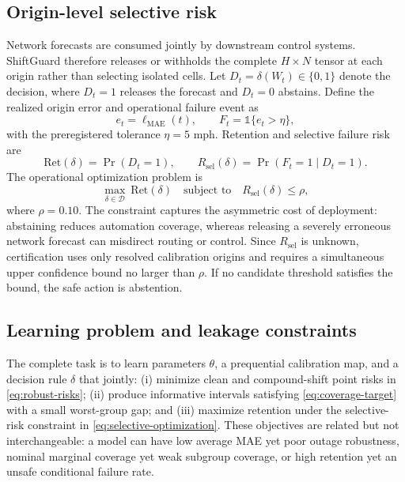 \documentclass[pdflatex,sn-mathphys-num]{sn-jnl}
\begin{document}
\subsection{Origin-level selective risk}
Network forecasts are consumed jointly by downstream control systems.
ShiftGuard therefore releases or withholds the complete $H\times N$ tensor at
each origin rather than selecting isolated cells. Let
$D_t=\delta(W_t)\in\{0,1\}$ denote the decision, where $D_t=1$ releases the
forecast and $D_t=0$ abstains. Define the realized origin error and operational
failure event as
\begin{equation}
 e_t=\ell_{\mathrm{MAE}}(t),\qquad
 F_t=\mathbb{1}\{e_t>\eta\},
 \label{eq:origin-failure}
\end{equation}
with the preregistered tolerance $\eta=5$ mph. Retention and selective failure
risk are
\begin{equation}
 \mathrm{Ret}(\delta)=\Pr(D_t=1),\qquad
 R_{\mathrm{sel}}(\delta)=\Pr(F_t=1\mid D_t=1).
 \label{eq:selective-risk}
\end{equation}
The operational optimization problem is
\begin{equation}
 \max_{\delta\in\mathcal{D}}\ \mathrm{Ret}(\delta)
 \quad\text{subject to}\quad
 R_{\mathrm{sel}}(\delta)\leq\rho,
 \label{eq:selective-optimization}
\end{equation}
where $\rho=0.10$. The constraint captures the asymmetric cost of deployment:
abstaining reduces automation coverage, whereas releasing a severely erroneous
network forecast can misdirect routing or control. Since $R_{\mathrm{sel}}$ is
unknown, certification uses only resolved calibration origins and requires a
simultaneous upper confidence bound no larger than $\rho$. If no candidate
threshold satisfies the bound, the safe action is abstention.

\subsection{Learning problem and leakage constraints}
The complete task is to learn parameters $\theta$, a prequential calibration
map, and a decision rule $\delta$ that jointly: (i) minimize clean and
compound-shift point risks in \cref{eq:robust-risks}; (ii) produce informative
intervals satisfying \cref{eq:coverage-target} with a small worst-group gap;
and (iii) maximize retention under the selective-risk constraint in
\cref{eq:selective-optimization}. These objectives are related but not
interchangeable: a model can have low average MAE yet poor outage robustness,
nominal marginal coverage yet weak subgroup coverage, or high retention yet an
unsafe conditional failure rate.
\end{document}
